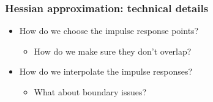 \documentclass[10pt,final,xcolor=dvipsnames]{beamer}
\begin{document}
\begin{frame}
	\frametitle{Hessian approximation: technical details}
	{\Large
		\begin{itemize}
			\setlength\itemsep{2em}
			\item How do we choose the impulse response points?
			\begin{itemize}
				\item How do we make sure they don't overlap?
			\end{itemize}
			\item How do we interpolate the impulse responses? 
			\begin{itemize}
				\item {\large What about boundary issues?}
			\end{itemize}
		\end{itemize}
	}
\end{frame}


\end{document}
